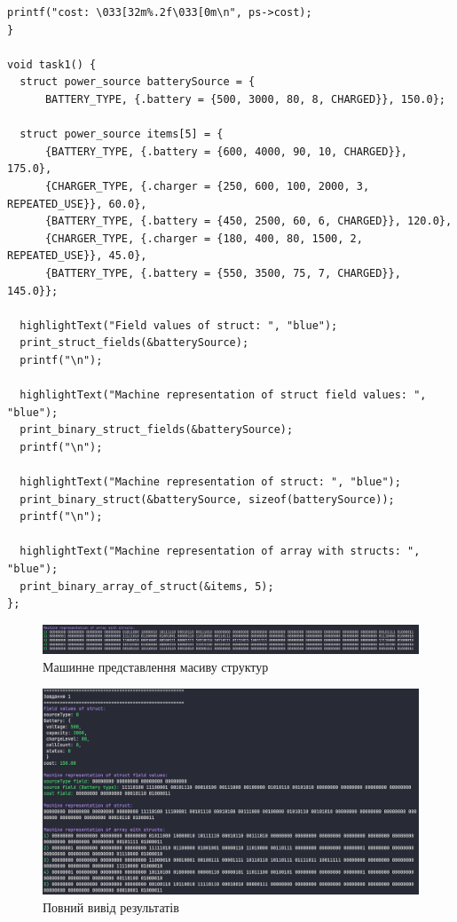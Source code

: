 \begin{lstlisting}[style=customc]
  printf("cost: \033[32m%.2f\033[0m\n", ps->cost);
}

void task1() {
  struct power_source batterySource = {
      BATTERY_TYPE, {.battery = {500, 3000, 80, 8, CHARGED}}, 150.0};

  struct power_source items[5] = {
      {BATTERY_TYPE, {.battery = {600, 4000, 90, 10, CHARGED}}, 175.0},
      {CHARGER_TYPE, {.charger = {250, 600, 100, 2000, 3, REPEATED_USE}}, 60.0},
      {BATTERY_TYPE, {.battery = {450, 2500, 60, 6, CHARGED}}, 120.0},
      {CHARGER_TYPE, {.charger = {180, 400, 80, 1500, 2, REPEATED_USE}}, 45.0},
      {BATTERY_TYPE, {.battery = {550, 3500, 75, 7, CHARGED}}, 145.0}};

  highlightText("Field values of struct: ", "blue");
  print_struct_fields(&batterySource);
  printf("\n");

  highlightText("Machine representation of struct field values: ", "blue");
  print_binary_struct_fields(&batterySource);
  printf("\n");

  highlightText("Machine representation of struct: ", "blue");
  print_binary_struct(&batterySource, sizeof(batterySource));
  printf("\n");

  highlightText("Machine representation of array with structs: ", "blue");
  print_binary_array_of_struct(&items, 5);
};
\end{lstlisting}

\begin{figure}[h!]
    \centering
    \includegraphics[width=18cm]{reports/algos/lab4/assets/5.png}
    \caption{Машинне представлення масиву структур}
\end{figure}

\begin{figure}[h!]
    \centering
    \includegraphics[width=18cm]{reports/algos/lab4/assets/6.png}
    \caption{Повний вивід результатів}
\end{figure}


